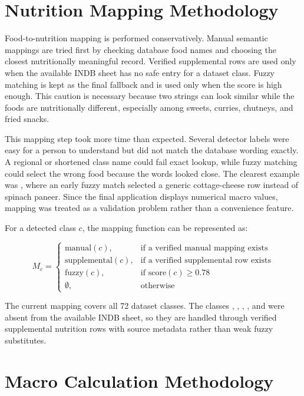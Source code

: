 \section{Nutrition Mapping Methodology}

Food-to-nutrition mapping is performed conservatively. Manual semantic mappings are tried first by checking database food names and choosing the closest nutritionally meaningful record. Verified supplemental rows are used only when the available INDB sheet has no safe entry for a dataset class. Fuzzy matching is kept as the final fallback and is used only when the score is high enough. This caution is necessary because two strings can look similar while the foods are nutritionally different, especially among sweets, curries, chutneys, and fried snacks.

This mapping step took more time than expected. Several detector labels were easy for a person to understand but did not match the database wording exactly. A regional or shortened class name could fail exact lookup, while fuzzy matching could select the wrong food because the words looked close. The clearest example was , where an early fuzzy match selected a generic cottage-cheese row instead of spinach paneer. Since the final application displays numerical macro values, mapping was treated as a validation problem rather than a convenience feature.

For a detected class $c$, the mapping function can be represented as:

\begin{equation}
M_c =
\begin{cases}
\text{manual}(c), & \text{if a verified manual mapping exists}\\
\text{supplemental}(c), & \text{if a verified supplemental row exists}\\
\text{fuzzy}(c), & \text{if score}(c) \geq 0.78\\
\emptyset, & \text{otherwise}
\end{cases}
\end{equation}

The current mapping covers all 72 dataset classes. The classes , , , , and  were absent from the available INDB sheet, so they are handled through verified supplemental nutrition rows with source metadata rather than weak fuzzy substitutes.

\section{Macro Calculation Methodology}

